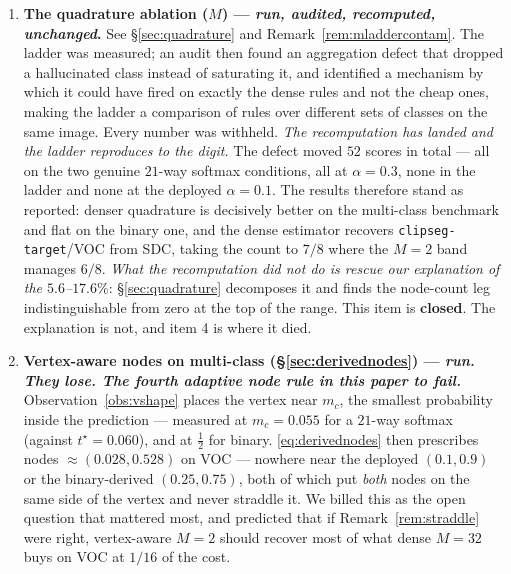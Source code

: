 \documentclass[11pt]{article}
\theoremstyle{remark}
\newcommand{\HDF}{\mathrm{HD}_{95}}
\begin{document}
\begin{enumerate}
This also closes the paper's one theory--practice gap, and more cleanly than the measured
$\rho$ does. Remark~\ref{rem:nobridge} exists because $\HDF$ is a percentile and no
inequality connects the band to the $r_2$ it stands in for. \emph{Deploy $r_2$ and there
is nothing to bridge} --- and we now know that deploying it costs nothing and ranks
strictly better. The band width earned its place by being cheap to compute and easy to
draw; on this evidence it has no other claim.

\emph{The same measurement condemns the rank-anchored ablation
\eqref{eq:rankanchor}}: against the dense $M=32$ reference, the rank-anchored band
scores \emph{below} the constant-threshold band in $6/8$ conditions and the
rank-anchored $r_2$ below $r_2$ in $8/8$. It is a worse estimator of the level-set
risk on real data, not merely on the synthetic populations of
\S\ref{sec:threshold}.

\item \textbf{The quadrature ablation ($M$) --- \emph{run, audited, recomputed,
unchanged}.} See \S\ref{sec:quadrature} and Remark~\ref{rem:mladdercontam}. The ladder
was measured; an audit then found an aggregation defect that dropped a hallucinated class
instead of saturating it, and identified a mechanism by which it could have fired on
exactly the dense rules and not the cheap ones, making the ladder a comparison of rules
over different sets of classes on the same image. Every number was withheld. \emph{The
recomputation has landed and the ladder reproduces to the digit.} The defect moved $52$
scores in total --- all on the two genuine $21$-way softmax conditions, all at
$\alpha = 0.3$, none in the ladder and none at the deployed $\alpha = 0.1$. The results
therefore stand as reported: denser quadrature is decisively better on the multi-class
benchmark and flat on the binary one, and the dense estimator recovers
\texttt{clipseg-target}/VOC from SDC, taking the count to $7/8$ where the $M=2$ band
manages $6/8$. \emph{What the recomputation did not do is rescue our explanation of the
$5.6$--$17.6\%$}: \S\ref{sec:quadrature} decomposes it and finds the node-count leg
indistinguishable from zero at the top of the range. This item is \textbf{closed}. The
explanation is not, and item 4 is where it died.

\item \textbf{Vertex-aware nodes on multi-class (\S\ref{sec:derivednodes}) --- \emph{run.
They lose. The fourth adaptive node rule in this paper to fail.}}
Observation~\ref{obs:vshape} places the vertex near $m_c$, the smallest probability
inside the prediction --- measured at $m_c = 0.055$ for a $21$-way softmax (against
$t^\star = 0.060$), and at $\tfrac12$ for binary. \eqref{eq:derivednodes} then prescribes
nodes $\approx (0.028, 0.528)$ on VOC --- nowhere near the deployed $(0.1, 0.9)$ or the
binary-derived $(0.25, 0.75)$, both of which put \emph{both} nodes on the same side of
the vertex and never straddle it. We billed this as the open question that mattered most,
and predicted that if Remark~\ref{rem:straddle} were right, vertex-aware $M=2$ should
recover most of what dense $M=32$ buys on VOC at $1/16$ of the cost.


\end{enumerate}
\end{document}
